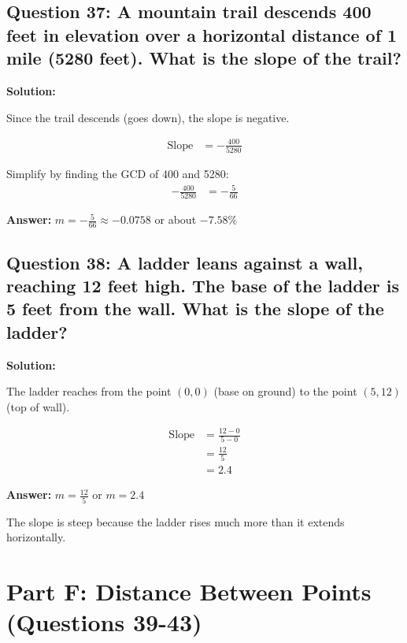 \documentclass[12pt]{article}
\begin{document}
\vspace{0.3cm}

\subsection*{Question 37: A mountain trail descends 400 feet in elevation over a horizontal distance of 1 mile (5280 feet). What is the slope of the trail?}

\noindent\textbf{Solution:}

Since the trail descends (goes down), the slope is negative.

\begin{align*}
\text{Slope} &= -\frac{400}{5280}
\end{align*}

Simplify by finding the GCD of 400 and 5280:
\begin{align*}
-\frac{400}{5280} &= -\frac{5}{66}
\end{align*}

\textbf{Answer: } $m = -\frac{5}{66} \approx -0.0758$ or about $-7.58\%$

\vspace{0.3cm}

\subsection*{Question 38: A ladder leans against a wall, reaching 12 feet high. The base of the ladder is 5 feet from the wall. What is the slope of the ladder?}

\noindent\textbf{Solution:}

The ladder reaches from the point $(0, 0)$ (base on ground) to the point $(5, 12)$ (top of wall).

\begin{align*}
\text{Slope} &= \frac{12 - 0}{5 - 0} \\
&= \frac{12}{5} \\
&= 2.4
\end{align*}

\textbf{Answer: } $m = \frac{12}{5}$ or $m = 2.4$

The slope is steep because the ladder rises much more than it extends horizontally.

\newpage

\section{Part F: Distance Between Points (Questions 39-43)}
\end{document}
